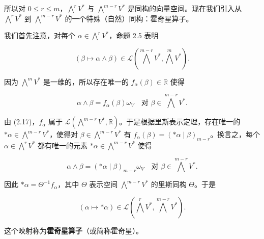 \begin{remark}
所以对 $ 0 \le r \le m $，$ \bigwedge^{r}V^{*} $ 与 $ \bigwedge^{m-r}V^{*} $ 是同构的向量空间。现在我们引入从 $ \bigwedge^{r}V^{*} $ 到 $ \bigwedge^{m-r}V^{*} $ 的一个特殊（自然）同构：霍奇星算子。

我们首先注意，对每个 $ \alpha \in \bigwedge^{r}V^{*} $，命题 2.5 表明

\begin{equation}
(\beta \mapsto \alpha \wedge \beta) \in \mathcal{L}\left(\bigwedge^{m-r}V^{*}, \bigwedge^{m}V^{*}\right).\tag{2.17}
\end{equation}

因为 $ \bigwedge^{m}V^{*} $ 是一维的，所以存在唯一的 $ f_{\alpha}(\beta) \in \mathbb{R} $ 使得

\[
\alpha \wedge \beta = f_{\alpha}(\beta)\omega_V \quad \text{对 } \beta \in \bigwedge^{m-r}V^{*}.
\]

由 (2.17)，$ f_{\alpha} $ 属于 $ \mathcal{L}(\bigwedge^{m-r}V^{*}, \mathbb{R}) $。于是根据里斯表示定理，存在唯一的 $ \ast\alpha \in \bigwedge^{m-r}V^{*} $，使得对 $ \beta \in \bigwedge^{m-r}V^{*} $ 有 $ f_{\alpha}(\beta) = (\ast\alpha \mid \beta)_{m-r} $。换言之，每个 $ \alpha \in \bigwedge^{r}V^{*} $ 都有唯一的元素 $ \ast\alpha \in \bigwedge^{m-r}V^{*} $ 使得

\begin{equation}
\alpha \wedge \beta = (\ast\alpha \mid \beta)_{m-r}\omega_V \quad \text{对 } \beta \in \bigwedge^{m-r}V^{*}.\tag{2.18}
\end{equation}

因此 $ \ast\alpha = \Theta^{-1}f_{\alpha} $，其中 $ \Theta $ 表示空间 $ \bigwedge^{m-r}V^{*} $ 的里斯同构 $ \Theta $。于是

\begin{equation}
(\alpha \mapsto \ast\alpha) \in \mathcal{L}\left(\bigwedge^{r}V^{*}, \bigwedge^{m-r}V^{*}\right).\tag{2.19}
\end{equation}

这个映射称为\textbf{霍奇星算子}（或简称霍奇星）。

\end{remark}

